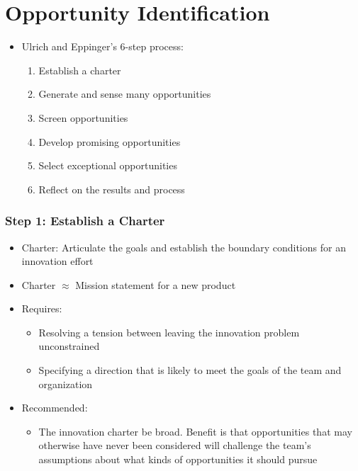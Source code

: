 \documentclass[openany,12pt,a4paper]{book}
\begin{document}
\section{Opportunity Identification}
\begin{itemize}
    \item Ulrich and Eppinger's 6-step process:
    \begin{enumerate}
        \item Establish a charter
        \item Generate and sense many opportunities
        \item Screen opportunities
        \item Develop promising opportunities
        \item Select exceptional opportunities
        \item Reflect on the results and process
    \end{enumerate}
\end{itemize}

\subsubsection{Step 1: Establish a Charter}
\begin{itemize}
    \item Charter: Articulate the goals and establish the boundary conditions for an innovation effort
    \item Charter $\approx$ Mission statement for a new product
    \item Requires:
    \begin{itemize}
        \item Resolving a tension between leaving the innovation problem unconstrained
        \item Specifying a direction that is likely to meet the goals of the team and organization
    \end{itemize}
    \item Recommended:
    \begin{itemize}
        \item The innovation charter be broad. Benefit is that opportunities that may otherwise have never been considered will challenge the team’s assumptions about what kinds of opportunities it should pursue
    \end{itemize}
\end{itemize}
\end{document}
